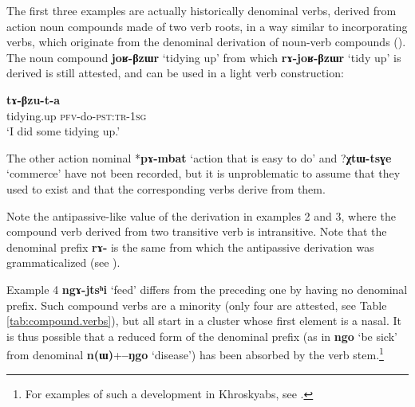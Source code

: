 \documentclass[oldfontcommands,oneside,a4paper,11pt]{article}
\newcommand{\ipa}[1]{{\phon\textbf{#1}}}
\newcommand{\jpg}[2]{\ipa{#1} `#2'}
\begin{document}
The first three examples are actually historically denominal verbs, derived from action noun compounds made of two verb roots, in a way similar to incorporating verbs, which originate from the denominal derivation of noun-verb compounds (\citealt{jacques12incorp}). The noun compound \jpg{joʁ-βzɯr}{tidying up} from which \jpg{rɤ-joʁ-βzɯr}{tidy up} is derived is still attested, and can be used in a light verb construction:

\begin{exe}
\ex 
 \gll \ipa{joʁβzɯr} \ipa{tɤ-βzu-t-a} \\
 tidying.up \textsc{pfv}-do-\textsc{pst:tr-1sg} \\
 \glt `I did some tidying up.'
\end{exe}

The other action nominal *\ipa{pɤ-mbat} `action that is easy to do' and ?\ipa{χtɯ-tsɣe} `commerce' have not been recorded, but it is unproblematic to assume that they used to exist and that the corresponding verbs derive from them.

Note the antipassive-like value of the derivation in examples 2 and 3, where the compound verb derived from two transitive verb is intransitive. Note that the denominal prefix \ipa{rɤ-} is the same from which the antipassive derivation was grammaticalized (see  \citealt{jacques14antipassive}).

Example 4 \jpg{ngɤ-jtsʰi}{feed} differs from the preceding one by having no denominal prefix. Such compound verbs are a minority (only four are attested, see Table \ref{tab:compound.verbs}), but all start in a cluster whose first element is a nasal. It is thus possible that a reduced form of the denominal prefix (as in \jpg{ngo}{be sick} from denominal \ipa{n(ɯ)}+\jpg{--ŋgo}{disease}) has been absorbed by the verb stem.\footnote{For examples of such a development in Khroskyabs, see \citet{jacques12incorp, lai13affixale}. }
\end{document}
